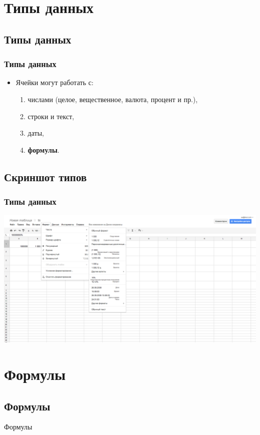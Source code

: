 \documentclass[compress,red]{beamer}
\begin{document}
\section{Типы данных}
\subsection{Типы данных}
\begin{frame}[fragile]
  \frametitle{Типы данных}
  \begin{itemize}
    \item Ячейки могут работать с:
      \begin{enumerate}
          \item числами (целое, вещественное, валюта, процент и пр.),
          \item строки и текст,
          \item даты,
          \item \textbf{формулы}. 
      \end{enumerate}
  \end{itemize}
\end{frame}

\subsection{Скриншот типов}
\begin{frame}[fragile]
  \frametitle{Типы данных}
  \centerline{\includegraphics[width=1.0\textwidth]{images/04.png}}
\end{frame}

\section{Формулы}
\subsection{Формулы}
\begin{frame}
  \begin{center}
    \Huge{Формулы}
  \end{center}
\end{frame}
\end{document}
